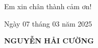 \documentclass[main.tex]{subfiles}
\begin{document}




\vspace{6pt}
\begin{flushright} Em xin chân thành cảm ơn! \end{flushright}

\hspace{12cm}Ngày 07 tháng 03 năm 2025

\vspace{2cm}

\hspace{12.25cm}\textbf{NGUYỄN HẢI CƯỜNG}
\end{document}
